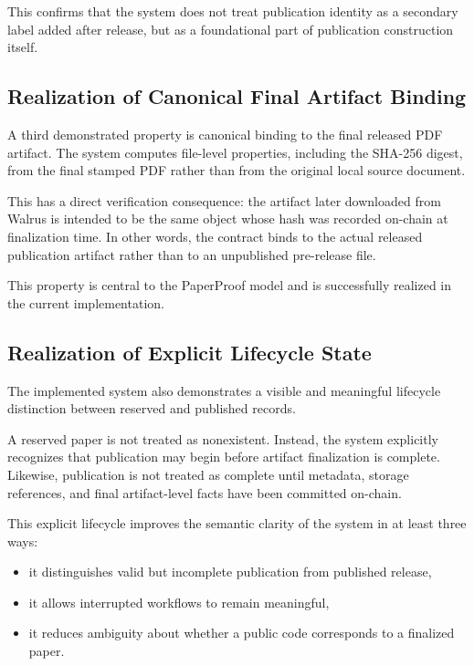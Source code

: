 \documentclass[journal]{IEEEtran}
\begin{document}
This confirms that the system does not treat publication identity as a secondary label added after release, but as a foundational part of publication construction itself.

\subsection{Realization of Canonical Final Artifact Binding}

A third demonstrated property is canonical binding to the final released PDF artifact. The system computes file-level properties, including the SHA-256 digest, from the final stamped PDF rather than from the original local source document.

This has a direct verification consequence: the artifact later downloaded from Walrus is intended to be the same object whose hash was recorded on-chain at finalization time. In other words, the contract binds to the actual released publication artifact rather than to an unpublished pre-release file.

This property is central to the PaperProof model and is successfully realized in the current implementation.

\subsection{Realization of Explicit Lifecycle State}

The implemented system also demonstrates a visible and meaningful lifecycle distinction between reserved and published records.

A reserved paper is not treated as nonexistent. Instead, the system explicitly recognizes that publication may begin before artifact finalization is complete. Likewise, publication is not treated as complete until metadata, storage references, and final artifact-level facts have been committed on-chain.

This explicit lifecycle improves the semantic clarity of the system in at least three ways:
\begin{itemize}
    \item it distinguishes valid but incomplete publication from published release,
    \item it allows interrupted workflows to remain meaningful,
    \item it reduces ambiguity about whether a public code corresponds to a finalized paper.
\end{itemize}
\end{document}
